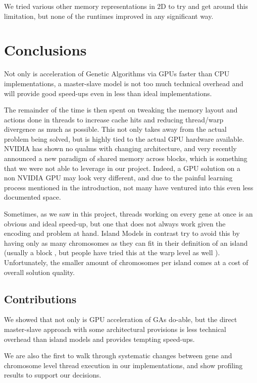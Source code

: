 \documentclass[11pt]{article}       %
\begin{document}
We tried various other memory representations in 2D to try and get around this limitation, but none of the runtimes improved in any significant way.

\section{Conclusions} \label{conc}

Not only is acceleration of Genetic Algorithms via GPUs faster than CPU implementations, a master-slave model is not too much technical overhead and will provide good speed-ups even in less than ideal implementations.

The remainder of the time is then spent on tweaking the memory layout and actions done in threads to increase cache hits and reducing thread/warp divergence as much as possible. This not only takes away from the actual problem being solved, but is highly tied to the actual GPU hardware available. NVIDIA has shown no qualms with changing architecture, and very recently announced a new paradigm of shared memory across blocks, which is something that we were not able to leverage in our project. Indeed, a GPU solution on a non NVIDIA GPU may look very different, and due to the painful learning process mentioned in the introduction, not many have ventured into this even less documented space.

Sometimes, as we saw in this project, threads working on every gene at once is an obvious and ideal speed-up, but one that does not always work given the encoding and problem at hand. Island Models in contrast try to avoid this by having only as many chromosomes as they can fit in their definition of an island (usually a block \cite{Janssen2022-kr}, but people have tried this at the warp level as well \cite{Amin2022-xd}). Unfortunately, the smaller amount of chromosomes per island comes at a cost of overall solution quality.


\subsection{Contributions}
We showed that not only is GPU acceleration of GAs do-able, but the direct master-slave approach with some architectural provisions is less technical overhead than island models and provides tempting speed-ups. 

We are also the first to walk through systematic changes between gene and chromosome level thread execution in our implementations, and show profiling results to support our decisions.
\end{document}
